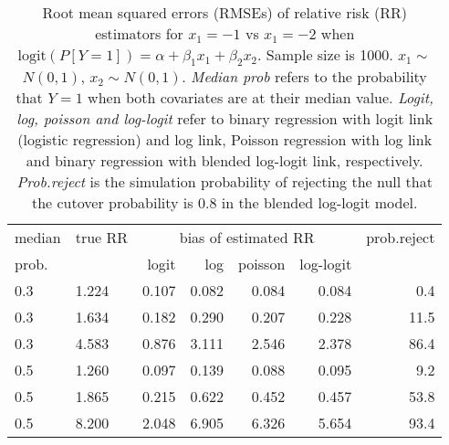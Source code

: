 \documentclass[12pt,a4paper]{article}
\begin{document}
\begin{table}[H] 
\small\sf\centering 
\caption{Root mean squared errors (RMSEs) of relative risk (RR) estimators for $x_1=-1$ vs $x_1=-2$ when $\mbox{logit}(P[Y=1])=\alpha+\beta_1 x_1 + \beta_2 x_2$. Sample size is 1000. $x_1 \sim $$N(0,1)$, $x_2 \sim N(0,1)$. {\it Median prob} refers to the probability that $Y=1$ when both covariates are at their median value. {\it Logit, log, poisson and log-logit} refer to binary regression with logit link (logistic regression) and log link, Poisson regression with log link and binary regression with blended log-logit link, respectively. {\it Prob.reject} is the simulation probability of rejecting the null that the cutover probability is $0.8$ in the blended log-logit model.} 
\begin{tabular}{llrrrrr} 
\toprule 
median & true RR & \multicolumn{4}{c}{bias of estimated RR} & prob.reject \\ 
prob. & & logit & log & poisson & log-logit  & \\ \midrule 
0.3 & 1.224 & 0.107 & 0.082 & 0.084 & 0.084 &  0.4 \\  
0.3 & 1.634 & 0.182 & 0.290 & 0.207 & 0.228 & 11.5 \\  
0.3 & 4.583 & 0.876 & 3.111 & 2.546 & 2.378 & 86.4 \\  
0.5 & 1.260 & 0.097 & 0.139 & 0.088 & 0.095 &  9.2 \\  
0.5 & 1.865 & 0.215 & 0.622 & 0.452 & 0.457 & 53.8 \\  
0.5 & 8.200 & 2.048 & 6.905 & 6.326 & 5.654 & 93.4 \\  
\bottomrule 
\end{tabular} 
\end{table} 
\end{document}
